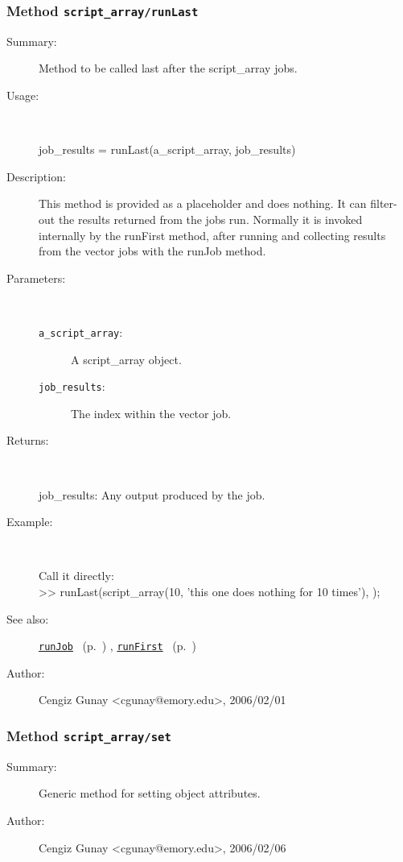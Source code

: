 \subsubsection[Method \texttt{runLast}]{Method \texttt{script\_array/runLast}}%
%
\label{ref_script_array__runLast}%
\hypertarget{ref_script_array__runLast}{}%
\begin{description}
\item[Summary:]Method to be called last after the script\_array jobs.
%
\item[Usage:]~%
\begin{lyxcode}%
job\_results = runLast(a\_script\_array, job\_results)
%
\end{lyxcode}%
%
\item[Description:]%
This method is provided as a placeholder and does nothing. It can filter-out the
 results returned from the jobs run. Normally it is invoked internally by the runFirst
 method, after running and collecting results from the vector jobs with the runJob method.
\item[Parameters:]~
\begin{description}%
\item[\texttt{a\_script\_array}:]
 A script\_array object.
\item[\texttt{job\_results}:]
 The index within the vector job.
\end{description}%
%
\item[Returns:
]~

   job\_results: Any output produced by the job.
%
\item[Example:]~
\begin{lyxcode} Call it directly:
\\%
 >> runLast(script\_array(10, 'this one does nothing for 10 times'), {});
\\%
\end{lyxcode}
%
\item[See also:]%
\hyperlink{ref_runJob}{\texttt{runJob}}%
\ (p.~\pageref{ref_runJob})%
%
, \hyperlink{ref_runFirst}{\texttt{runFirst}}%
\ (p.~\pageref{ref_runFirst})%
%
%
\item[Author:]%
Cengiz Gunay <cgunay@emory.edu>, 2006/02/01
%
\end{description}
\methodline%
\subsubsection[Method \texttt{set}]{Method \texttt{script\_array/set}}%
%
\label{ref_script_array__set}%
\hypertarget{ref_script_array__set}{}%
\begin{description}
\item[Summary:]Generic method for setting object attributes.
%
%
%
%
%
%
%
\item[Author:]%
Cengiz Gunay <cgunay@emory.edu>, 2006/02/06
%
\end{description}
\methodline%
